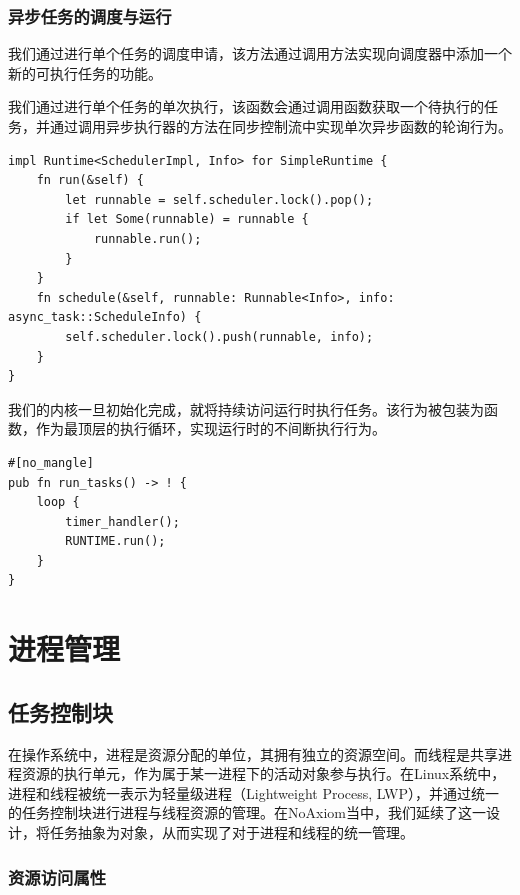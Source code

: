 \documentclass{article}
\begin{document}
\subsubsection{异步任务的调度与运行}

我们通过进行单个任务的调度申请，该方法通过调用方法实现向调度器中添加一个新的可执行任务的功能。

我们通过进行单个任务的单次执行，该函数会通过调用函数获取一个待执行的任务，并通过调用异步执行器的方法在同步控制流中实现单次异步函数的轮询行为。

\begin{lstlisting}
impl Runtime<SchedulerImpl, Info> for SimpleRuntime {
    fn run(&self) {
        let runnable = self.scheduler.lock().pop();
        if let Some(runnable) = runnable {
            runnable.run();
        }
    }
    fn schedule(&self, runnable: Runnable<Info>, info: async_task::ScheduleInfo) {
        self.scheduler.lock().push(runnable, info);
    }
}
\end{lstlisting}

我们的内核一旦初始化完成，就将持续访问运行时执行任务。该行为被包装为函数，作为最顶层的执行循环，实现运行时的不间断执行行为。

\begin{lstlisting}
#[no_mangle]
pub fn run_tasks() -> ! {
    loop {
        timer_handler();
        RUNTIME.run();
    }
}
\end{lstlisting}

\newpage
\section{进程管理}
\subsection{任务控制块} \label{sec:task_control_block}

在操作系统中，进程是资源分配的单位，其拥有独立的资源空间。而线程是共享进程资源的执行单元，作为属于某一进程下的活动对象参与执行。在Linux系统中，进程和线程被统一表示为轻量级进程（Lightweight Process, LWP），并通过统一的任务控制块进行进程与线程资源的管理。在NoAxiom当中，我们延续了这一设计，将任务抽象为对象，从而实现了对于进程和线程的统一管理。

\subsubsection{资源访问属性}
\end{document}

